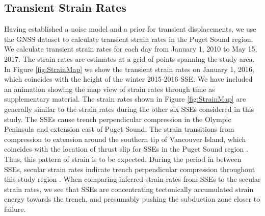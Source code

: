 \documentclass[extra,mreferee]{gji}
\begin{document}
\subsection{Transient Strain Rates}\label{sec:Results} 

Having established a noise model and a prior for transient
displacements, we use the GNSS dataset to calculate transient strain
rates in the Puget Sound region. We calculate transient strain rates
for each day from January 1, 2010 to May 15, 2017. The strain rates
are estimates at a grid of points spanning the study area. In Figure
\ref{fig:StrainMap} we show the transient strain rates on January 1,
2016, which coincides with the height of the winter 2015-2016 SSE. We
have included an animation showing the map view of strain rates
through time as supplementary material. The strain rates shown in
Figure \ref{fig:StrainMap} are generally similar to the strain rates
during the other six SSEs considered in this study. The SSEs cause
trench perpendicular compression in the Olympic Peninsula and
extension east of Puget Sound. The strain transitions from compression
to extension around the southern tip of Vancouver Island, which
coincides with the location of thrust slip for SSEs in the Puget Sound
region \citep[e.g.,][]{Dragert2001,Wech2009,Schmidt2010}. Thus, this
pattern of strain is to be expected. During the period in between
SSEs, secular strain rates indicate trench perpendicular compression
throughout this study region \citep{Murray2000, McCaffrey2007,
McCaffrey2013}. When comparing inferred strain rates from SSEs to the
secular strain rates, we see that SSEs are concentrating tectonically
accumulated strain energy towards the trench, and presumably pushing
the subduction zone closer to failure.

\end{document}
